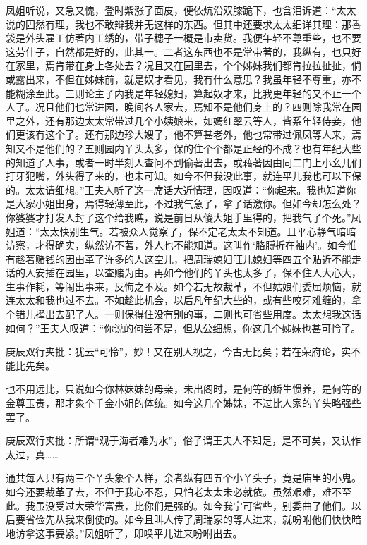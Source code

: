 \begin{parag}
    凤姐听说，又急又愧，登时紫涨了面皮，便依炕沿双膝跪下，也含泪诉道：“太太说的固然有理，我也不敢辩我并无这样的东西。但其中还要求太太细详其理：那香袋是外头雇工仿著内工绣的，带子穗子一概是市卖货。我便年轻不尊重些，也不要这劳什子，自然都是好的，此其一。二者这东西也不是常带著的，我纵有，也只好在家里，焉肯带在身上各处去？况且又在园里去，个个姊妹我们都肯拉拉扯扯，倘或露出来，不但在姊妹前，就是奴才看见，我有什么意思？我虽年轻不尊重，亦不能糊涂至此。三则论主子内我是年轻媳妇，算起奴才来，比我更年轻的又不止一个人了。况且他们也常进园，晚间各人家去，焉知不是他们身上的？四则除我常在园里之外，还有那边太太常带过几个小姨娘来，如嫣红翠云等人，皆系年轻侍妾，他们更该有这个了。还有那边珍大嫂子，他不算甚老外，他也常带过佩凤等人来，焉知又不是他们的？五则园内丫头太多，保的住个个都是正经的不成？也有年纪大些的知道了人事，或者一时半刻人查问不到偷著出去，或藉著因由同二门上小幺儿们打牙犯嘴，外头得了来的，也未可知。如今不但我没此事，就连平儿我也可以下保的。太太请细想。”王夫人听了这一席话大近情理，因叹道：“你起来。我也知道你是大家小姐出身，焉得轻薄至此，不过我气急了，拿了话激你。但如今却怎么处？你婆婆才打发人封了这个给我瞧，说是前日从傻大姐手里得的，把我气了个死。”凤姐道：“太太快别生气。若被众人觉察了，保不定老太太不知道。且平心静气暗暗访察，才得确实，纵然访不著，外人也不能知道。这叫作‘胳膊折在袖内’。如今惟有趁著赌钱的因由革了许多的人这空儿，把周瑞媳妇旺儿媳妇等四五个贴近不能走话的人安插在园里，以查赌为由。再如今他们的丫头也太多了，保不住人大心大，生事作耗，等闹出事来，反悔之不及。如今若无故裁革，不但姑娘们委屈烦恼，就连太太和我也过不去。不如趁此机会，以后凡年纪大些的，或有些咬牙难缠的，拿个错儿撵出去配了人。一则保得住没有别的事，二则也可省些用度。太太想我这话如何？”王夫人叹道：“你说的何尝不是，但从公细想，你这几个姊妹也甚可怜了。\begin{note}庚辰双行夹批：犹云“可怜”，妙！又在别人视之，今古无比矣；若在荣府论，实不能比先矣。\end{note}也不用远比，只说如今你林妹妹的母亲，未出阁时，是何等的娇生惯养，是何等的金尊玉贵，那才象个千金小姐的体统。如今这几个姊妹，不过比人家的丫头略强些罢了。\begin{note}庚辰双行夹批：所谓“观于海者难为水”，俗子谓王夫人不知足，是不可矣，又认作太过，真……\end{note}通共每人只有两三个丫头象个人样，余者纵有四五个小丫头子，竟是庙里的小鬼。如今还要裁革了去，不但于我心不忍，只怕老太太未必就依。虽然艰难，难不至此。我虽没受过大荣华富贵，比你们是强的。如今我宁可省些，别委曲了他们。以后要省俭先从我来倒使的。如今且叫人传了周瑞家的等人进来，就吩咐他们快快暗地访拿这事要紧。”凤姐听了，即唤平儿进来吩咐出去。
\end{parag}


